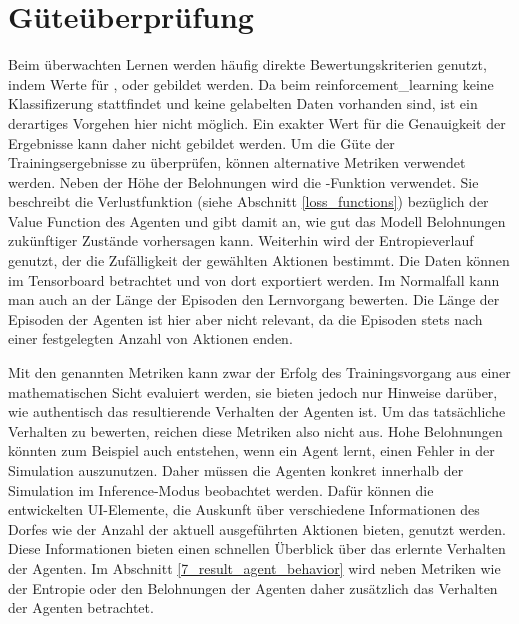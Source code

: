 \section{Güteüberprüfung}
Beim überwachten Lernen werden häufig direkte Bewertungskriterien genutzt, indem Werte für ,  oder  gebildet werden. Da beim \ac{reinforcement_learning} keine Klassifizerung stattfindet und keine gelabelten Daten vorhanden sind, ist ein derartiges Vorgehen hier nicht möglich. Ein exakter Wert für die Genauigkeit der Ergebnisse kann daher nicht gebildet werden.
Um die Güte der Trainingsergebnisse zu überprüfen, können alternative Metriken verwendet werden. Neben der Höhe der Belohnungen wird die -Funktion verwendet. Sie beschreibt die Verlustfunktion (siehe Abschnitt \ref{loss_functions}) bezüglich der Value Function des Agenten und gibt damit an, wie gut das Modell Belohnungen zukünftiger Zustände vorhersagen kann. Weiterhin wird der  Entropieverlauf genutzt, der die Zufälligkeit der gewählten Aktionen bestimmt. Die Daten können im Tensorboard betrachtet und von dort exportiert werden. Im Normalfall kann man auch an der Länge der Episoden den Lernvorgang bewerten. Die Länge der Episoden der Agenten ist hier aber nicht relevant, da die Episoden stets nach einer festgelegten Anzahl von Aktionen enden.

Mit den genannten Metriken kann zwar der Erfolg des Trainingsvorgang aus einer mathematischen Sicht evaluiert werden, sie bieten jedoch nur Hinweise darüber, wie authentisch das resultierende Verhalten der Agenten ist. Um das tatsächliche Verhalten zu bewerten, reichen diese Metriken also nicht aus. Hohe Belohnungen könnten zum Beispiel auch entstehen, wenn ein Agent lernt, einen Fehler in der Simulation auszunutzen. Daher müssen die Agenten konkret innerhalb der Simulation im Inference-Modus beobachtet werden. Dafür können die entwickelten UI-Elemente, die Auskunft über verschiedene Informationen des Dorfes wie der Anzahl der aktuell ausgeführten Aktionen bieten, genutzt werden. Diese Informationen bieten einen schnellen Überblick über das erlernte Verhalten der Agenten. Im Abschnitt \ref{7_result_agent_behavior} wird neben Metriken wie der Entropie oder den Belohnungen der Agenten daher zusätzlich das Verhalten der Agenten betrachtet.













